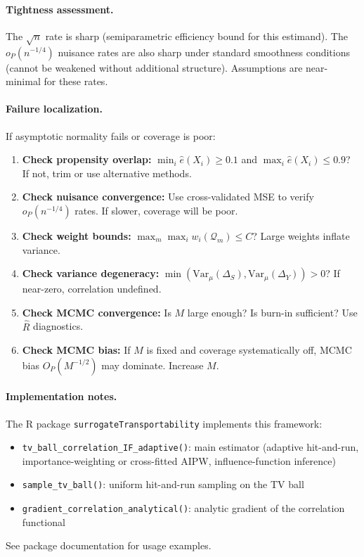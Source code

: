 \paragraph{Tightness assessment.}
The $\sqrt{n}$ rate is sharp (semiparametric efficiency bound for this estimand). The $o_P(n^{-1/4})$ nuisance rates are also sharp under standard smoothness conditions (cannot be weakened without additional structure). Assumptions are near-minimal for these rates.

\paragraph{Failure localization.}
If asymptotic normality fails or coverage is poor:
\begin{enumerate}
\item \textbf{Check propensity overlap:} $\min_i \hat{e}(X_i) \geq 0.1$ and $\max_i \hat{e}(X_i) \leq 0.9$? If not, trim or use alternative methods.
\item \textbf{Check nuisance convergence:} Use cross-validated MSE to verify $o_P(n^{-1/4})$ rates. If slower, coverage will be poor.
\item \textbf{Check weight bounds:} $\max_m \max_i w_i(\mathcal{Q}_m) \leq C$? Large weights inflate variance.
\item \textbf{Check variance degeneracy:} $\min(\text{Var}_\mu(\Delta_S), \text{Var}_\mu(\Delta_Y)) > 0$? If near-zero, correlation undefined.
\item \textbf{Check MCMC convergence:} Is $M$ large enough? Is burn-in sufficient? Use $\hat{R}$ diagnostics.
\item \textbf{Check MCMC bias:} If $M$ is fixed and coverage systematically off, MCMC bias $O_P(M^{-1/2})$ may dominate. Increase $M$.
\end{enumerate}

\paragraph{Implementation notes.}
The R package \texttt{surrogateTransportability} implements this framework:
\begin{itemize}
\item \texttt{tv\_ball\_correlation\_IF\_adaptive()}: main estimator (adaptive hit-and-run,
  importance-weighting or cross-fitted AIPW, influence-function inference)
\item \texttt{sample\_tv\_ball()}: uniform hit-and-run sampling on the TV ball
\item \texttt{gradient\_correlation\_analytical()}: analytic gradient of the correlation functional
\end{itemize}
See package documentation for usage examples.

